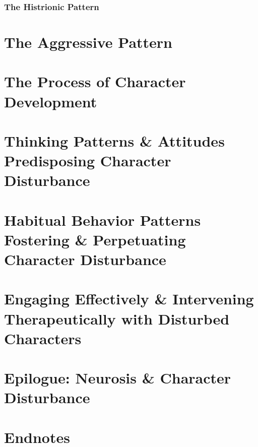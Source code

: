\documentclass{article}
\numberwithin{equation}{section}
\begin{document}
\subsubsection{The Histrionic Pattern}


\section{The Aggressive Pattern}


\section{The Process of Character Development}


\section{Thinking Patterns \& Attitudes Predisposing Character Disturbance}


\section{Habitual Behavior Patterns Fostering \& Perpetuating Character Disturbance}


\section{Engaging Effectively \& Intervening Therapeutically with Disturbed Characters}


\section{Epilogue: Neurosis \& Character Disturbance}


\section*{Endnotes}


\printbibliography[heading=bibintoc]
	
\end{document}
